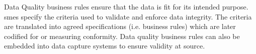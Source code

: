 %
%
Data Quality business rules ensure that the data is
fit for its intended purpose.
\Glspl{sme} specify the criteria used to validate and enforce data integrity.
The criteria are translated into agreed specifications (i.e. business rules) which are later codified for
 or measuring conformity.
Data quality business rules can also be embedded into data capture systems to ensure validity at source.

